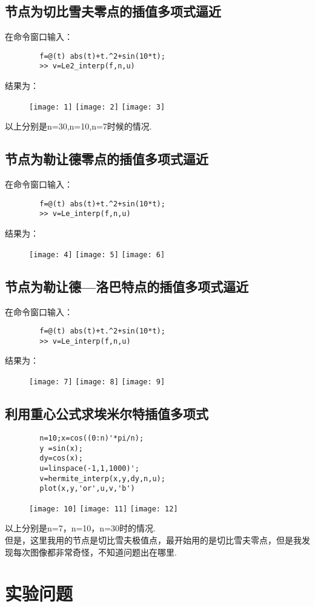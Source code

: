 \documentclass{article}
\begin{document}
	\subsection{节点为切比雪夫零点的插值多项式逼近}
	在命令窗口输入：
	\begin{lstlisting}
		f=@(t) abs(t)+t.^2+sin(10*t);
		>> v=Le2_interp(f,n,u)
	\end{lstlisting}
	结果为：
	\begin{figure}[htbp]
		\texttt{[image: 1]}
		\texttt{[image: 2]}
		\texttt{[image: 3]}
	\end{figure}
	以上分别是n=30,n=10,n=7时候的情况.
	\subsection{节点为勒让德零点的插值多项式逼近}
	在命令窗口输入：
	\begin{lstlisting}
		f=@(t) abs(t)+t.^2+sin(10*t);
		>> v=Le_interp(f,n,u)
	\end{lstlisting}
	结果为：
	\begin{figure}[htbp]
		\texttt{[image: 4]}
		\texttt{[image: 5]}
		\texttt{[image: 6]}
	\end{figure}
	\subsection{节点为勒让德—洛巴特点的插值多项式逼近}
	在命令窗口输入：
	\begin{lstlisting}
		f=@(t) abs(t)+t.^2+sin(10*t);
		>> v=Le_interp(f,n,u)
	\end{lstlisting}
	结果为：
	\begin{figure}[htbp]
		\texttt{[image: 7]}
		\texttt{[image: 8]}
		\texttt{[image: 9]}
	\end{figure}
	\subsection{利用重心公式求埃米尔特插值多项式}
	\begin{lstlisting}
		n=10;x=cos((0:n)'*pi/n);
		y =sin(x);
		dy=cos(x);
		u=linspace(-1,1,1000)';
		v=hermite_interp(x,y,dy,n,u);
		plot(x,y,'or',u,v,'b')
	\end{lstlisting}
	\begin{figure}[htbp]
		\texttt{[image: 10]}
		\texttt{[image: 11]}
		\texttt{[image: 12]}
	\end{figure}
	以上分别是n=7，n=10，n=30时的情况.\\
	但是，这里我用的节点是切比雪夫极值点，最开始用的是切比雪夫零点，但是我发现每次图像都非常奇怪，不知道问题出在哪里.
	\section{实验问题}
	
	
	
\end{document}
